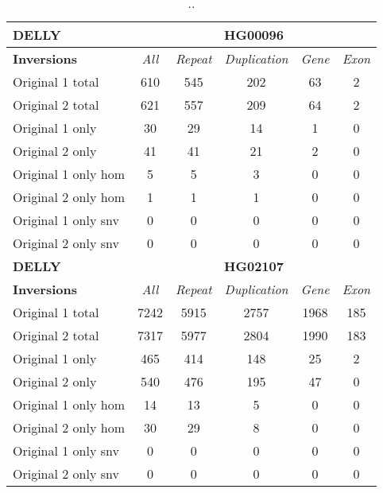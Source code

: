 \begin{table}[htb]
\begin{center}
\begin{tabular}{|l|c||c|c|c|c|}
\hline
{\bf DELLY} & \multicolumn{5}{|c|}{\bf HG00096} \\
\hline
\cline{2-6}
{\bf Inversions} & {\it All} & {\it Repeat} & {\it Duplication} & {\it Gene} & {\it Exon} \\
\hline
Original 1 total & 610 & 545 & 202 & 63 & 2\\ 
\hline
Original 2 total & 621 & 557 & 209 & 64 & 2\\ 
\hline
Original 1 only & 30 & 29 & 14 & 1 & 0\\ 
\hline
Original 2 only & 41 & 41 & 21 & 2 & 0\\ 
\hline
Original 1 only hom & 5 & 5 & 3 & 0 & 0\\ 
\hline
Original 2 only hom & 1 & 1 & 1 & 0 & 0\\ 
\hline
Original 1 only snv & 0 & 0 & 0 & 0 & 0\\ 
\hline
Original 2 only snv & 0 & 0 & 0 & 0 & 0\\ 
\hline
\hline
{\bf DELLY} & \multicolumn{5}{|c|}{\bf HG02107} \\
\hline
\cline{2-6}
{\bf Inversions} & {\it All} & {\it Repeat} & {\it Duplication} & {\it Gene} & {\it Exon} \\
\hline
Original 1 total & 7242 & 5915 & 2757 & 1968 & 185\\ 
\hline
Original 2 total & 7317 & 5977 & 2804 & 1990 & 183\\ 
\hline
Original 1 only & 465 & 414 & 148 & 25 & 2\\ 
\hline
Original 2 only & 540 & 476 & 195 & 47 & 0\\ 
\hline
Original 1 only hom & 14 & 13 & 5 & 0 & 0\\ 
\hline
Original 2 only hom & 30 & 29 & 8 & 0 & 0\\ 
\hline
Original 1 only snv & 0 & 0 & 0 & 0 & 0\\ 
\hline
Original 2 only snv & 0 & 0 & 0 & 0 & 0\\ 
\hline
\end{tabular}
\end{center}
\caption{ .. }
\label{tab:orig-vs-shuf-delly-inv}
\end{table}

